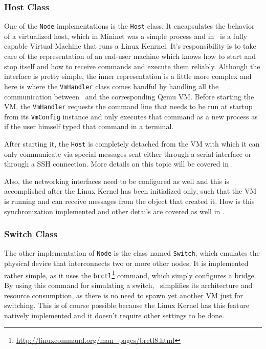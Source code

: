 \subsubsection{Host Class}
\label{sub-sub-sec:host-class}

One of the \texttt{Node} implementations is the \texttt{Host} class.
It encapsulates the behavior of a virtualized host, which in Mininet was a simple process and in \project\ is a fully capable Virtual Machine that runs a Linux Kenrnel.
It's responsibility is to take care of the representation of an end-user machine which knows how to start and stop itself and how to receive commands and execute them reliably.
Although the interface is pretty simple, the inner representation is a little more complex and here is where the \texttt{VmHandler} class comes handful by handling all the communication between \project\ and the corresponding Qemu VM.
Before starting the VM, the \texttt{VmHandler} requests the command line that needs to be run at startup from its \texttt{VmConfig} instance and only executes that command as a new process as if the user himself typed that command in a terminal.

After starting it, the \texttt{Host} is completely detached from the VM with which it can only communicate via special messages sent either through a serial interface or through a SSH connection.
More details on this topic will be covered in .

Also, the networking interfaces need to be configured as well and this is accomplished after the Linux Kernel has been initialized only, such that the VM is running and can receive messages from the object that created it.
How is this synchronization implemented and other details are covered as well in .

\subsubsection{Switch Class}
\label{sub-sub-sec:switch-class}

The other implementation of \texttt{Node} is the class named \texttt{Switch}, which emulates the physical device that interconnects two or more other nodes.
It is implemented rather simple, as it uses the \texttt{brctl}\footnote{\url{http://linuxcommand.org/man_pages/brctl8.html}} command, which simply configures a bridge.
By using this command for simulating a switch, \project\ simplifies its architecture and resource consumption, as there is no need to spawn yet another VM just for switching.
This is of course possible because the Linux Kernel has this feature natively implemented and it doesn't require other settings to be done.

